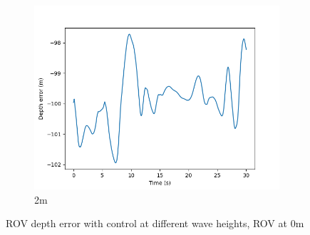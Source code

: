 \documentclass[class=article, crop=false]{standalone}
\begin{document}
\begin{figure}
\begin{subfigure}[b]{0.48\textwidth}
        \centering
        \includegraphics{scenario1/rov-0m/2.0m/rov_depth_error_controlled}
        \caption{2m}
        \label{}
    \end{subfigure}

    \caption{ROV depth error with control at different wave heights, ROV at 0m}
\end{figure}
\end{document}
